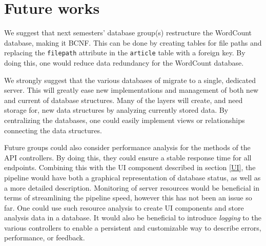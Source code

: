 \section{Future works}
We suggest that next semesters' database group(s) restructure the WordCount database, making it BCNF. 
This can be done by creating tables for file paths and replacing the \texttt{filepath} attribute in the \texttt{article} table with a foreign key.
By doing this, one would reduce data redundancy for the WordCount database. 

We strongly suggest that the various databases of \knox{} migrate to a single, dedicated server.
This will greatly ease new implementations and management of both new and current of database structures.
Many of the layers will create, and need storage for, new data structures by analyzing currently stored data.
By centralizing the \knox{} databases, one could easily implement views or relationships connecting the data structures.

Future groups could also consider performance analysis for the methods of the API controllers. 
By doing this, they could ensure a stable response time for all endpoints.
Combining this with the UI component described in section \ref{UI}, the pipeline would have both a graphical representation of database status, as well as a more detailed description.
Monitoring of server resources would be beneficial in terms of streamlining the pipeline speed, however this has not been an issue so far.
One could use such resource analysis to create UI components and store analysis data in a database. 
It would also be beneficial to introduce \textit{logging}\cite{ASPLogging} to the various controllers to enable a persistent and customizable way to describe errors, performance, or feedback.
